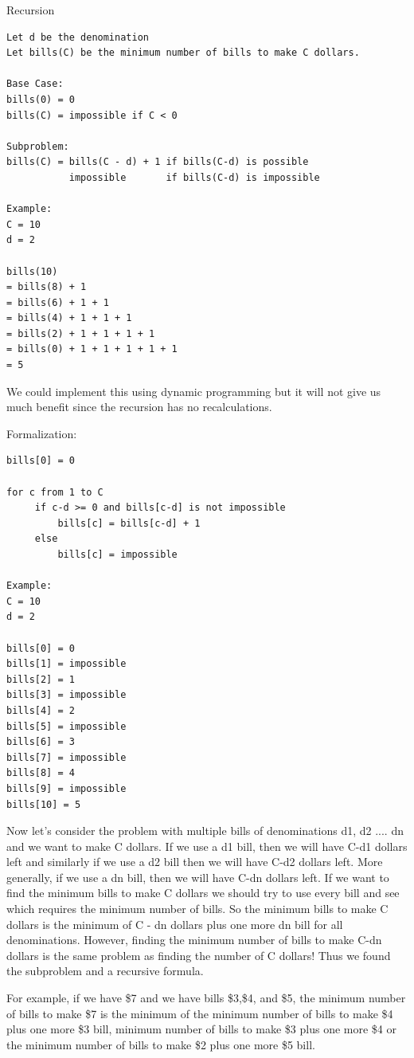 \documentclass[11pt,oneside]{book}
\begin{document}
Recursion

\begin{lstlisting}
Let d be the denomination
Let bills(C) be the minimum number of bills to make C dollars.

Base Case:
bills(0) = 0
bills(C) = impossible if C < 0

Subproblem:
bills(C) = bills(C - d) + 1 if bills(C-d) is possible
           impossible       if bills(C-d) is impossible

Example:
C = 10
d = 2

bills(10) 
= bills(8) + 1
= bills(6) + 1 + 1
= bills(4) + 1 + 1 + 1
= bills(2) + 1 + 1 + 1 + 1
= bills(0) + 1 + 1 + 1 + 1 + 1
= 5
\end{lstlisting}

We could implement this using dynamic programming but it will not give us much benefit since the recursion has no recalculations.

Formalization:

\begin{lstlisting}
bills[0] = 0

for c from 1 to C
     if c-d >= 0 and bills[c-d] is not impossible
         bills[c] = bills[c-d] + 1
     else
         bills[c] = impossible

Example:
C = 10
d = 2

bills[0] = 0
bills[1] = impossible
bills[2] = 1
bills[3] = impossible
bills[4] = 2
bills[5] = impossible
bills[6] = 3
bills[7] = impossible
bills[8] = 4
bills[9] = impossible
bills[10] = 5
\end{lstlisting}

Now let's consider the problem with multiple bills of denominations d1, d2 .... dn and we want to make C dollars. If we use a d1 bill, then we will have C-d1 dollars left and similarly if we use a d2 bill then we will have C-d2 dollars left. More generally, if we use a dn bill, then we will have C-dn dollars left. If we want to find the minimum bills to make C dollars we should try to use every bill and see which requires the minimum number of bills. So the minimum bills to make C dollars is the minimum of C - dn dollars plus one more dn bill for all denominations. However, finding the minimum number of bills to make C-dn dollars is the same problem as finding the number of C dollars! Thus we found the subproblem and a recursive formula.

For example, if we have \$7 and we have bills \$3,\$4, and \$5, the minimum number of bills to make \$7 is the minimum of the minimum number of bills to make \$4 plus one more \$3 bill, minimum number of bills to make \$3 plus one more \$4 or the minimum number of bills to make \$2 plus one more \$5 bill.
\end{document}
